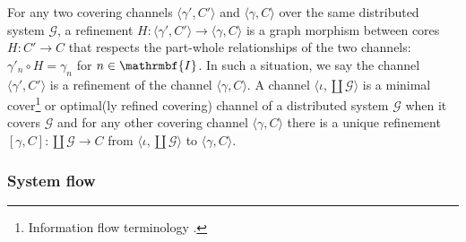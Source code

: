 \documentclass{amsart}
\theoremstyle{remark}
\theoremstyle{definition}
\begin{document}
%
For any two covering channels ${\langle{\gamma',C'}\rangle}$ and ${\langle{\gamma,C}\rangle}$
over the same distributed system $\mathcal{G}$,
a refinement $H \colon {\langle{\gamma',C'}\rangle} \rightarrow {\langle{\gamma,C}\rangle}$
is a graph morphism between cores $H \colon C' \rightarrow C$
that respects the part-whole relationships of the two channels:
$\gamma'_{n} \circ H = \gamma_{n}$ for $n \in \mathrmbf{I}$.
In such a situation, we say 
the channel ${\langle{\gamma',C'}\rangle}$ 
is a refinement of the channel ${\langle{\gamma,C}\rangle}$.
A channel ${\langle{\iota,\coprod\mathcal{G}}\rangle}$ 
is a minimal cover\footnote{Information flow terminology \cite{BS:IF}.} 
or optimal(ly refined covering) channel of a distributed system $\mathcal{G}$
when it covers $\mathcal{G}$ and for any other covering channel ${\langle{\gamma,C}\rangle}$
there is a unique refinement $[\gamma,C] \colon \coprod\mathcal{G} \rightarrow C$
from ${\langle{\iota,\coprod\mathcal{G}}\rangle}$ to ${\langle{\gamma,C}\rangle}$.

\subsubsection{System flow}
\end{document}
